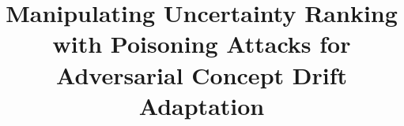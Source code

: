\documentclass[sigconf,anonymous,review]{acmart}
\begin{document}
	
	\title{Manipulating Uncertainty Ranking with Poisoning Attacks for Adversarial Concept Drift Adaptation}
	
	
	
	\renewcommand{\shortauthors}{Trovato et al.}
	
\end{document}
